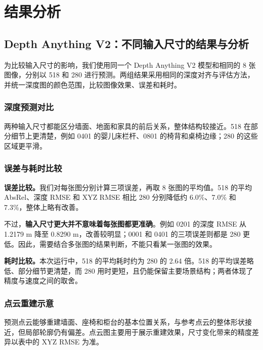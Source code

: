 \clearpage
\section{结果分析}
\subsection{Depth Anything V2：不同输入尺寸的结果与分析}

为比较输入尺寸的影响，我们使用同一个 Depth Anything V2 模型和相同的 8 张图像，分别以 518 和 280 进行预测。两组结果采用相同的深度对齐与评估方法，并统一深度图的颜色范围，比较图像效果、误差和耗时。

\subsubsection{深度预测对比}


两种输入尺寸都能区分墙面、地面和家具的前后关系，整体结构较接近。518 在部分细节上更清楚，例如 0401 的婴儿床栏杆、0801 的椅背和桌椅边缘；280 的这些区域更平滑。

\clearpage

\subsubsection{误差与耗时比较}



\textbf{误差比较。}我们对每张图分别计算三项误差，再取 8 张图的平均值。518 的平均 AbsRel、深度 RMSE 和 XYZ RMSE 相比 280 分别降低约 6.0\%、7.0\% 和 7.3\%，整体上略有改善。

不过，\textbf{输入尺寸更大并不意味着每张图都更准确}。例如 0201 的深度 RMSE 从 1.2179 m 降至 0.8290 m，改善较明显；0001 和 0401 的三项误差则都是 280 更低。因此，需要结合多张图的结果判断，不能只看某一张图的效果。



\textbf{耗时比较。}本次运行中，518 的平均耗时约为 280 的 2.64 倍。518 的平均误差略低、部分细节更清楚，而 280 用时更短，且仍能保留主要场景结构；两者体现了精度与速度之间的取舍。

\subsubsection{点云重建示意}


预测点云能够重建墙面、座椅和柜台的基本位置关系，与参考点云的整体形状接近，但局部轮廓仍有偏差。点云图主要用于展示重建效果，尺寸变化带来的精度差异以表中的 XYZ RMSE 为准。
